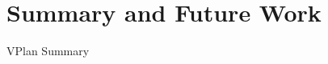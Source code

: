\documentclass[sigplan,11pt,nonacm]{acmart}
\begin{document}


\section{Summary and Future Work}
\label{sec:summary}
VPlan Summary



\end{document}
